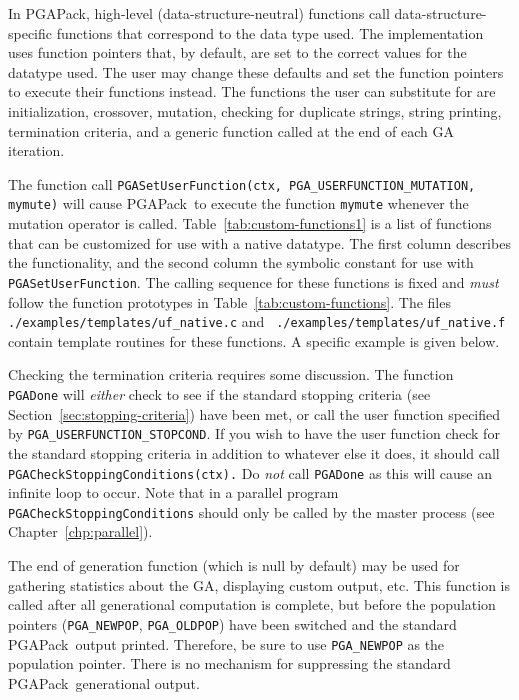 \documentclass{report}
\newcommand{\pga}{PGAPack}
\begin{document}
In \pga, high-level (data-structure-neutral) functions call
data-structure-specific functions that correspond to the data type used.  The
implementation uses function pointers that, by default, are set to the correct
values for the datatype used.  The user may change these defaults and set the
function pointers to execute their functions instead.  The functions the user
can substitute for are initialization, crossover, mutation, checking for
duplicate strings, string printing, termination criteria, and a generic
function called at the end of each GA iteration.

The function call {\tt PGASetUserFunction(ctx, PGA\_USERFUNCTION\_MUTATION,
mymute)} will cause
\pga\ to execute the function {\tt mymute} whenever the mutation operator is
called.  Table~\ref{tab:custom-functions1} is a list of functions that can be
customized for use with a native datatype.  The first column describes the
functionality, and the second column the symbolic constant for use with {\tt
PGASetUserFunction}.  The calling sequence for these functions is fixed and
{\em must} follow the function prototypes in Table~\ref{tab:custom-functions}.
The files {\tt ./examples/templates/uf\_native.c} and {\tt
./examples/templates/uf\_native.f} contain template routines for these
functions.  A specific example is given below.

Checking the termination criteria requires some discussion.  The function {\tt
PGADone} will {\em either} check to see if the standard stopping criteria (see
Section~\ref{sec:stopping-criteria}) have been met, or call the user function
specified by {\tt PGA\_USERFUNCTION\_STOPCOND}.  If you wish to have the user
function check for the  standard stopping criteria  in addition to whatever
else it does, it should call {\tt PGACheckStoppingConditions(ctx).}
Do {\em not} call {\tt PGADone} as this will cause an infinite loop to occur.
Note that in a parallel program {\tt PGACheckStoppingConditions} should only
be called by the master process (see Chapter~\ref{chp:parallel}).

The end of generation function (which is null by default) may be used for
gathering statistics about the GA, displaying custom output, etc.  This
function is called after all generational computation is complete, but before
the population pointers ({\tt PGA\_NEWPOP}, {\tt PGA\_OLDPOP}) have been
switched and the standard \pga\ output printed.  Therefore, be sure to use
{\tt PGA\_NEWPOP} as the population pointer.  There is no mechanism for
suppressing the standard \pga\ generational output.
\end{document}
